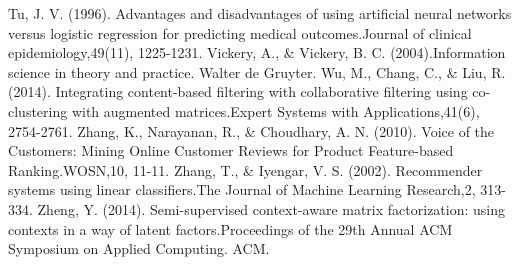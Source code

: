 \documentclass[12pt]{article}
\begin{document}
\begin{thebibliography}{100}
 Tu, J. V. (1996). Advantages and disadvantages of using artificial neural networks versus logistic regression for predicting medical outcomes.Journal of clinical epidemiology,49(11), 1225-1231.
 Vickery, A., \& Vickery, B. C. (2004).Information science in theory and practice. Walter de Gruyter.
 Wu, M., Chang, C., \& Liu, R. (2014). Integrating content-based filtering with collaborative filtering using co-clustering with augmented matrices.Expert Systems with Applications,41(6), 2754-2761.
 Zhang, K., Narayanan, R., \& Choudhary, A. N. (2010). Voice of the Customers: Mining Online Customer Reviews for Product Feature-based Ranking.WOSN,10, 11-11.
 Zhang, T., \& Iyengar, V. S. (2002). Recommender systems using linear classifiers.The Journal of Machine Learning Research,2, 313-334.
 Zheng, Y. (2014). Semi-supervised context-aware matrix factorization: using contexts in a way of latent factors.Proceedings of the 29th Annual ACM Symposium on Applied Computing. ACM.



\end{thebibliography} 

\begin{flushleft}

\end{flushleft}

\bigskip
\end{document}
